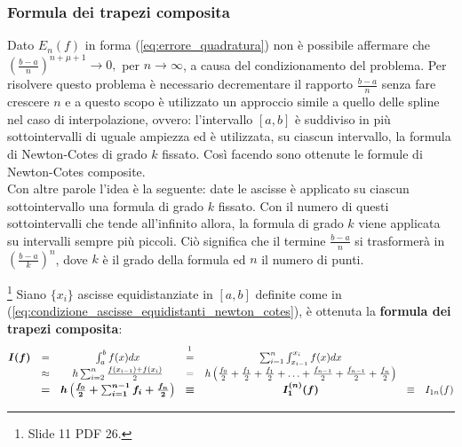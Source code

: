 \subsubsection{Formula dei trapezi composita}
Dato $E_n(f)$ in forma (\ref{eq:errore_quadratura}) non è possibile affermare che $\left(\frac{b-a}{n}\right)^{n+\mu +1}\rightarrow 0,$ per $ n\rightarrow\infty$, a causa del condizionamento del problema. Per risolvere questo problema è necessario decrementare il rapporto $\frac{b-a}{n}$ senza fare crescere $n$ e a questo scopo è utilizzato un approccio simile a quello delle spline nel caso di interpolazione, ovvero: l'intervallo $[a,b]$ è suddiviso in più sottointervalli di uguale ampiezza ed è utilizzata, su ciascun intervallo, la formula di Newton-Cotes di grado $k$ fissato. Così facendo sono ottenute le formule di Newton-Cotes composite.\\
Con altre parole l'idea è la seguente: date le ascisse è applicato su ciascun sottointervallo una formula di grado $k$ fissato. Con il numero di questi sottointervalli che tende all'infinito allora, la formula di grado $k$ viene applicata su intervalli sempre più piccoli. Ciò significa che il termine $\frac{b-a}{n}$ si trasformerà in $\left(\frac{b-a}{k}\right)^n$, dove $k$ è il grado della formula ed $n$ il numero di punti.
\begin{definition}\footnote{Slide 11 PDF 26.}
    Siano $\{x_i\}$ ascisse equidistanziate in $[a,b]$ definite come in (\ref{eq:condizione_ascisse_equidistanti_newton_cotes}), è ottenuta la \textbf{formula dei trapezi composita}:
    \begin{equation}\label{eq:formula_trapezi_composita}
        \begin{matrix}
            \boldsymbol{I(f)}&=&\int_a^b f(x) dx &\overset{\footnotemark}{=}&\sum_{i=1}^n\int_{x_{i-1}}^{x_i} f(x)dx\\
            &\approx& h\sum_{i=2}^n\frac{f(x_{i-1})+f(x_i)}{2} &=& h\left(\frac{f_0}{2}+\frac{f_1}{2}+\frac{f_1}{2}+\hdots +\frac{f_{n-1}}{2}+\frac{f_{n-1}}{2}+\frac{f_n}{2}\right)\\
            &\boldsymbol =&\boldsymbol{h\left(\frac{f_0}{2}+\sum_{i=1}^{n-1}f_i+\frac{f_n}{2}\right)} &\boldsymbol\equiv& \boldsymbol{I_1^{(n)}(f)} &\equiv& I_{1n}(f)
        \end{matrix}
    \end{equation}
\end{definition}


